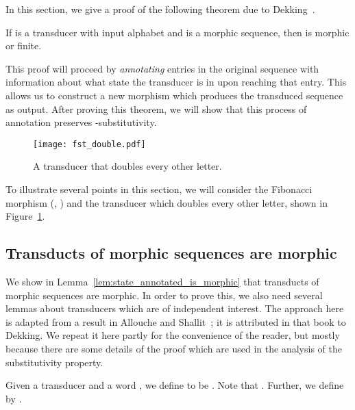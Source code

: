 \def\d{\delta}
\def\e{\epsilon}

\label{section-Dekking}
In this section, we give a proof of  the following theorem due to Dekking~\cite{dekk:94}.

\begin{theorem}\label{the:transducts_preserve_morphic}
  If  is a transducer with input alphabet  
  and  is a morphic sequence, then  is morphic or finite.
\end{theorem}

This proof will proceed by \emph{annotating} entries in the original sequence  
with information about what state the transducer is in upon reaching that entry.
This allows us to construct a new morphism which produces the transduced sequence  as output. 
After proving this theorem, we will show that this process of annotation preserves -substitutivity.

\begin{figure}[h!]
  \centering
  \texttt{[image: fst\_double.pdf]}
  \caption{A transducer that doubles every other letter.}
  \label{fig:double}
\end{figure}

\begin{example}\label{example-transducer}
  To illustrate several points in this section,
  we will consider the Fibonacci morphism (, ) 
  and the transducer which doubles every other letter, shown in Figure~\ref{fig:double}. 
\end{example}

\subsection{Transducts of morphic sequences are morphic}



We show in Lemma~\ref{lem:state_annotated_is_morphic} that transducts of morphic sequences
are morphic.
In order to prove this, we  also need several lemmas about transducers which are of independent interest. 
The approach here is adapted from a result in Allouche and Shallit~\cite{allo:shal:2003}; it is  attributed in that book  to Dekking. 
We repeat it here partly for the convenience of the reader, but mostly because there are some details of the proof which 
are used in the analysis of the substitutivity property.

\begin{definition}[, ]
  Given a transducer  and a word ,
  we define  to be . Note that .
  Further, we define  by
  .
  \label{definition-tau}
\end{definition}


